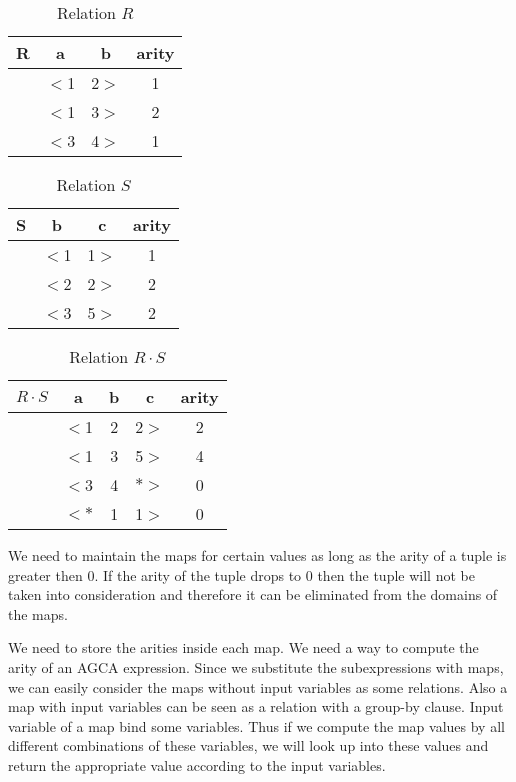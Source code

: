 \documentclass[12pt]{article}
\begin{document}
\begin{table}[ht]
\centering
\begin{tabular}{c c c c}
	R & a & b & arity\\ [0.2ex]
	\hline
	  & $<$1 & 2$>$ & 1 \\
	  & $<$1 & 3$>$ & 2 \\
	  & $<$3 & 4$>$ & 1 \\
\end{tabular}
\caption{Relation $R$}
\end{table}
\begin{table}[ht]
\centering
\begin{tabular}{c c c c}
	S & b & c & arity\\ [0.2ex]
	\hline
	  & $<$1 & 1$>$ & 1 \\
	  & $<$2 & 2$>$ & 2 \\
	  & $<$3 & 5$>$ & 2 \\
\end{tabular}
\caption{Relation $S$}
\end{table}
\begin{table}[ht]
\centering
\begin{tabular}{c c c c c}
	$R\cdot S$ & a & b & c & arity\\ [0.2ex]
	\hline
	  & $<$1 & 2 & 2$>$ & 2 \\
	  & $<$1 & 3 & 5$>$ & 4 \\
	  & $<$3 & 4 & $*>$ & 0 \\
	  & $<*$ & 1 & 1$>$ & 0 \\
\end{tabular}
\caption{Relation $R\cdot S$}
\end{table}

We need to maintain the maps for certain values as long as the arity of a tuple is greater then 0. If the arity  of the tuple drops to 0 then the tuple will not be taken into consideration and therefore it can be eliminated from the domains of the maps.

We need to store the arities inside each map. We need a way to compute the arity of an AGCA expression. Since we substitute the subexpressions with maps, we can easily consider the maps without input variables as some relations. Also a map with input variables can be seen as a relation with a group-by clause. Input variable of a map bind some variables. Thus if we compute the map values by all different combinations of these variables, we will look up into these values and return the appropriate value according to the input variables.  
\end{document}
